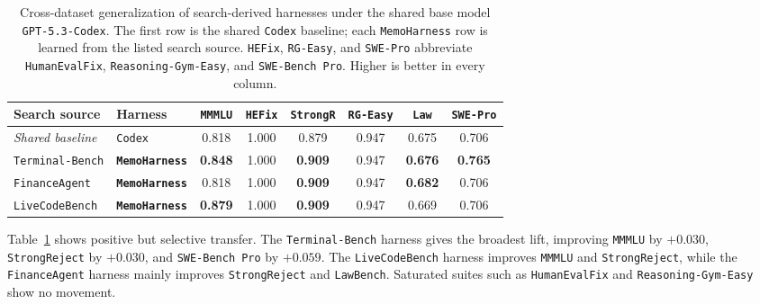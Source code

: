 \documentclass{article}
\newcommand{\tablehead}[1]{\textbf{\textcolor{narrareddeep}{#1}}}
\begin{document}
\begin{table}[t]
\centering
\caption{Cross-dataset generalization of search-derived harnesses under
the shared base model \texttt{GPT-5.3-Codex}. The first row is the
shared \texttt{Codex} baseline; each \texttt{MemoHarness} row is
learned from the listed search source.
\texttt{HEFix}, \texttt{RG-Easy}, and \texttt{SWE-Pro} abbreviate
\texttt{HumanEvalFix}, \texttt{Reasoning-Gym-Easy}, and
\texttt{SWE-Bench Pro}. Higher is better in every column.}
\label{tab:cross_dataset_results}
\footnotesize
\setlength{\tabcolsep}{3pt}
\renewcommand{\arraystretch}{1.14}
\begin{tabular*}{\textwidth}{@{\extracolsep{\fill}}llcccccc@{}}
\toprule
\rowcolor{tableheadbg}
\tablehead{Search source} & \tablehead{Harness}
& \tablehead{\texttt{MMMLU}}
& \tablehead{\texttt{HEFix}}
& \tablehead{\texttt{StrongR}}
& \tablehead{\texttt{RG-Easy}}
& \tablehead{\texttt{Law}}
& \tablehead{\texttt{SWE-Pro}} \\
\midrule
\rowcolor{tablestripebg}
\textit{Shared baseline}
& \texttt{Codex} & 0.818 & 1.000 & 0.879 & 0.947 & 0.675 & 0.706 \\
\arrayrulecolor{tableaccentrule}\cmidrule(lr){1-8}\arrayrulecolor{tableline}
\rowcolor{tableaccentbg}
\texttt{Terminal-Bench}
& \textbf{\textcolor{narrareddeep}{\texttt{MemoHarness}}}
& \textbf{\textcolor{narrareddeep}{0.848}} & 1.000
& \textbf{\textcolor{narrareddeep}{0.909}} & 0.947 & \textbf{\textcolor{narrareddeep}{0.676}}
& \textbf{\textcolor{narrareddeep}{0.765}} \\
\rowcolor{tableaccentbg}
\texttt{FinanceAgent}
& \textbf{\textcolor{narrareddeep}{\texttt{MemoHarness}}} & 0.818 & 1.000
& \textbf{\textcolor{narrareddeep}{0.909}} & 0.947 & \textbf{\textcolor{narrareddeep}{0.682}} & 0.706 \\
\rowcolor{tableaccentbg}
\texttt{LiveCodeBench}
& \textbf{\textcolor{narrareddeep}{\texttt{MemoHarness}}}
& \textbf{\textcolor{narrareddeep}{0.879}} & 1.000
& \textbf{\textcolor{narrareddeep}{0.909}} & 0.947 & 0.669 & 0.706 \\
\bottomrule
\end{tabular*}
\vspace{-11pt}
\end{table}

Table~\ref{tab:cross_dataset_results} shows positive but selective
transfer. The \texttt{Terminal-Bench} harness gives the broadest lift,
improving \texttt{MMMLU} by $+0.030$, \texttt{StrongReject} by
$+0.030$, and \texttt{SWE-Bench Pro} by $+0.059$. The
\texttt{LiveCodeBench} harness improves \texttt{MMMLU} and
\texttt{StrongReject}, while the \texttt{FinanceAgent} harness mainly
improves \texttt{StrongReject} and \texttt{LawBench}. Saturated suites
such as \texttt{HumanEvalFix} and \texttt{Reasoning-Gym-Easy} show no
movement.
\end{document}
